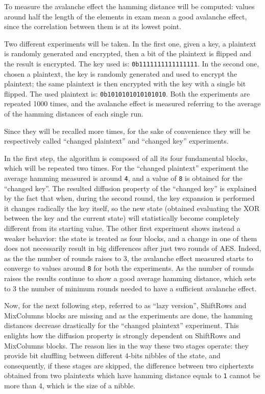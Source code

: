 \documentclass[12pt]{article}
\begin{document}
To measure the avalanche effect the hamming distance will be computed: values around half the length of the elements in exam mean a good avalanche effect, since the correlation between them is at its lowest point.

Two different experiments will be taken.
In the first one, given a key, a plaintext is randomly generated and encrypted, then a bit of the plaintext is flipped and the result is encrypted. The key used is: \verb|0b1111111111111111|.
In the second one, chosen a plaintext, the key is randomly generated and used to encrypt the plaintext; the same plaintext is then encrypted with the key with a single bit flipped. The used plaintext is: \verb|0b1010101010101010|.
Both the experiments are repeated 1000 times, and the avalanche effect is measured referring to the average of the hamming distances of each single run.

Since they will be recalled more times, for the sake of convenience they will be respectively called ``changed plaintext'' and ``changed key'' experiments.

In the first step, the algorithm is composed of all its four fundamental blocks, which will be repeated two times. For the ``changed plaintext'' experiment the average hamming measured is around \verb|4|, and a value of \verb|8| is obtained for the ``changed key''.
The resulted diffusion property of the ``changed key'' is explained by the fact that when, during the second round, the key expansion is performed it changes radically the key itself, so the new state (obtained evaluating the XOR between the key and the current state) will statistically become completely different from its starting value.
The other first experiment shows instead a weaker behavior: the state is treated as four blocks, and a change in one of them does not necessarily result in big differences after just two rounds of AES\@. Indeed, as the the number of rounds raises to 3, the avalanche effect measured starts to converge to values around \verb|8| for both the experiments.
As the number of rounds raises the results continue to show a good average hamming distance, which sets to 3 the number of minimum rounds needed to have a sufficient avalanche effect.

Now, for the next following step, referred to as ``lazy version'', ShiftRows and MixColumns blocks are missing and as the experiments are done, the hamming distances decrease drastically for the ``changed plaintext'' experiment. This enlights how the diffusion property is strongly dependent on ShiftRows and MixColumns blocks. The reason lies in the way these two stages operate: they provide bit shuffling between different 4-bits nibbles of the state, and consequently, if these stages are skipped, the difference between two ciphertexts obtained from two plaintexts which have hamming distance equals to \verb|1| cannot be more than 4, which is the size of a nibble.
\end{document}
